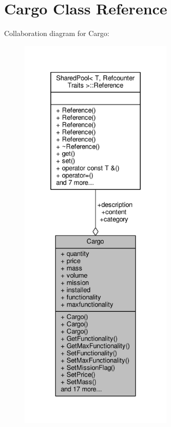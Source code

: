 \hypertarget{classCargo}{}\section{Cargo Class Reference}
\label{classCargo}


Collaboration diagram for Cargo\+:
\nopagebreak
\begin{figure}[H]
\begin{center}
\leavevmode
\includegraphics[height=550pt]{dc/d62/classCargo__coll__graph}
\end{center}
\end{figure}
